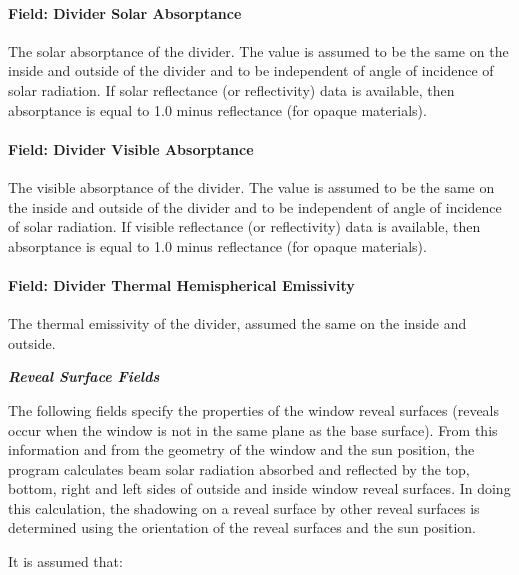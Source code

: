 \paragraph{Field: Divider Solar Absorptance}\label{field-divider-solar-absorptance}

The solar absorptance of the divider. The value is assumed to be the same on the inside and outside of the divider and to be independent of angle of incidence of solar radiation. If solar reflectance (or reflectivity) data is available, then absorptance is equal to 1.0 minus reflectance (for opaque materials).

\paragraph{Field: Divider Visible Absorptance}\label{field-divider-visible-absorptance}

The visible absorptance of the divider. The value is assumed to be the same on the inside and outside of the divider and to be independent of angle of incidence of solar radiation. If visible reflectance (or reflectivity) data is available, then absorptance is equal to 1.0 minus reflectance (for opaque materials).

\paragraph{Field: Divider Thermal Hemispherical Emissivity}\label{field-divider-thermal-hemispherical-emissivity}

The thermal emissivity of the divider, assumed the same on the inside and outside.

\textbf{\emph{Reveal Surface Fields}}

The following fields specify the properties of the window reveal surfaces (reveals occur when the window is not in the same plane as the base surface). From this information and from the geometry of the window and the sun position, the program calculates beam solar radiation absorbed and reflected by the top, bottom, right and left sides of outside and inside window reveal surfaces. In doing this calculation, the shadowing on a reveal surface by other reveal surfaces is determined using the orientation of the reveal surfaces and the sun position.

It is assumed that:

